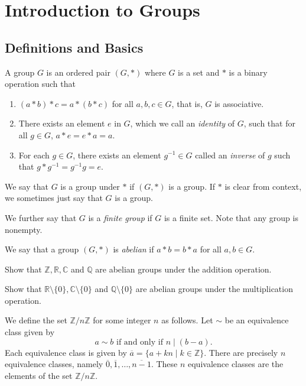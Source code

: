 \section{Introduction to Groups}
    
\subsection{Definitions and Basics}

\begin{definition}
    A group $G$ is an ordered pair $(G,*)$ where $G$ is a set and $*$ is a binary operation such that
    \begin{enumerate}
        \item $(a*b)*c=a*(b*c)$ for all $a,b,c\in G$, that is, $G$ is associative.
        \item There exists an element $e$ in $G$, which we call an \textit{identity} of $G$, such that for all $g\in G$, $a*e=e*a=a$.
        \item For each $g\in G$, there exists an element $g^{-1}\in G$ called an \textit{inverse} of $g$ such that $g*g^{-1}=g^{-1}g=e$.
    \end{enumerate}
\end{definition}

We say that $G$ is a group under $*$ if $(G,*)$ is a group. If $*$ is clear from context, we sometimes just say that $G$ is a group.

We further say that $G$ is a \textit{finite group} if $G$ is a finite set. Note that any group is nonempty.

\begin{definition}
    We say that a group $(G,*)$ is \textit{abelian} if $a*b=b*a$ for all $a,b\in G$.
\end{definition}

\begin{exercise}
    Show that $\mathbb{Z}, \mathbb{R}, \mathbb{C}$ and $\mathbb{Q}$ are abelian groups under the addition operation.
\end{exercise}
\begin{exercise}
    Show that $\mathbb{R}\setminus\{0\}, \mathbb{C}\setminus\{0\}$ and $\mathbb{Q}\setminus\{0\}$ are abelian groups under the multiplication operation.
\end{exercise}

We define the set $\mathbb{Z}/n\mathbb{Z}$ for some integer $n$ as follows. Let $\sim$ be an equivalence class given by
$$a\sim b\text{ if and only if }n\mid (b-a).$$
Each equivalence class is given by $\overline{a}=\{a+kn\mid k\in\mathbb{Z}\}$. There are precisely $n$ equivalence classes, namely $\overline{0}, \overline{1}, \ldots, \overline{n-1}$. These $n$ equivalence classes are the elements of the set $\mathbb{Z}/n\mathbb{Z}$.


